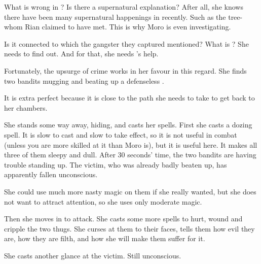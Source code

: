 What is wrong in \Malcur?
Is there a supernatural explanation?
After all, she knows there have been many supernatural happenings in \Malcur recently. 
Such as the tree-\sphyle whom Rian claimed to have met. 
This is why Moro is even investigating. 

Is it connected to  which the gangster they captured mentioned?
What is ?
She needs to find out.
And for that, she needs \Nasshikerr's help.



\begin{comment}
  \subsection{Finding victims}
\end{comment}

Fortunately, the upsurge of crime works in her favour in this regard. 
She finds two \human bandits mugging and beating up a defenseless \scatha.


It is extra perfect because it is close to the path she needs to take to get back to her chambers. 

She stands some way away, hiding, and casts her spells.
First she casts a dozing spell. 
It is slow to cast and slow to take effect, so it is not useful in combat (unless you are more skilled at it than Moro is), but it is useful here.
It makes all three of them sleepy and dull.
After 30 seconds' time, the two bandits are having trouble standing up.
The victim, who was already badly beaten up, has apparently fallen unconscious.


She could use much more nasty magic on them if she really wanted, but she does not want to attract attention, so she uses only moderate magic. 

Then she moves in to attack. 
She casts some more spells to hurt, wound and cripple the two thugs.
She curses at them to their faces, tells them how evil they are, how they are \human filth, and how she will make them suffer for it.

She casts another glance at the victim. Still unconscious.

